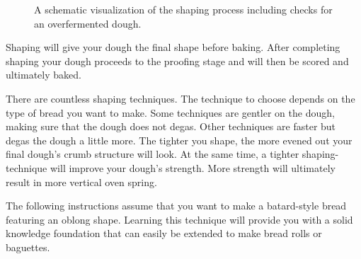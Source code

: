 \begin{figure}[!htb]
  \caption{A schematic visualization of the shaping process including checks for an overfermented dough.}
  \label{fig:shaping-decision-tree}
\end{figure}

Shaping will give your dough the final shape before baking. After
completing shaping your dough proceeds to the proofing stage and
will then be scored and ultimately baked.

There are countless shaping techniques. The technique to choose
depends on the type of bread you want to make. Some techniques
are gentler on the dough, making sure that the dough does not
degas. Other techniques are faster but degas the dough a little
more. The tighter you shape, the more evened out your final dough's
crumb structure will look. At the same time, a tighter shaping-technique
will improve your dough's strength. More strength will ultimately result
in more vertical oven spring.

The following instructions assume that you want to make a batard-style
bread featuring an oblong shape. Learning this technique
will provide you with a solid knowledge foundation that
can easily be extended to make bread rolls or baguettes.

